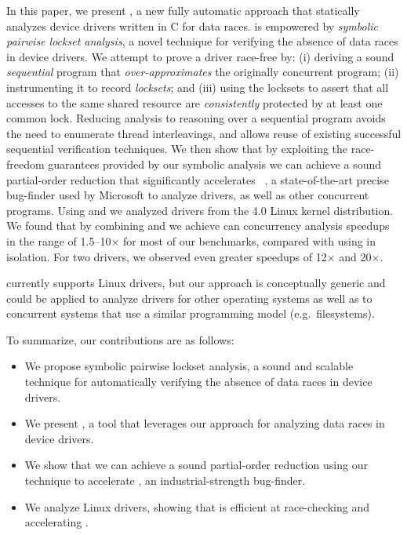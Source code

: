 In this paper, we present \whoop, a new fully automatic approach that statically analyzes device drivers written in C for data races. \whoop is empowered by \emph{symbolic pairwise lockset analysis}, a novel technique for verifying the absence of data races in device drivers. We attempt to prove a driver race-free by: (i) deriving a sound \emph{sequential} program that \emph{over-approximates} the originally concurrent program; (ii) instrumenting it to record \emph{locksets}; and (iii) using the locksets to assert that all accesses to the same shared resource are \emph{consistently} protected by at least one common lock. Reducing analysis to reasoning over a sequential program avoids the need to enumerate thread interleavings, and allows reuse of existing successful sequential verification techniques.
%
We then show that by exploiting the race-freedom guarantees provided by our symbolic analysis we can achieve a sound partial-order reduction that significantly accelerates \corral~\cite{lal2012corral}, a state-of-the-art precise bug-finder used by Microsoft to analyze drivers, as well as other concurrent programs. Using \whoop and \corral we analyzed \sizeOfBenchmarks drivers from the 4.0 Linux kernel distribution.  We found that by combining \whoop and \corral we achieve can concurrency analysis speedups in the range of 1.5--10$\times$ for most of our benchmarks, compared with using \corral in isolation.  For two drivers, we observed even greater speedups of 12$\times$ and 20$\times$.

\whoop currently supports Linux drivers, but our approach is conceptually generic and could be applied to analyze drivers for other operating systems as well as to concurrent systems that use a similar programming model (e.g.\ filesystems).

To summarize, our contributions are as follows:
\begin{itemize}
\item We propose symbolic pairwise lockset analysis, a sound and scalable technique for automatically verifying the absence of data races in device drivers.
\item We present \whoop, a tool that leverages our approach for analyzing data races in device drivers.
\item We show that we can achieve a sound partial-order reduction using our technique to accelerate \corral, an industrial-strength bug-finder.
\item We analyze \sizeOfBenchmarks Linux drivers, showing that \whoop is efficient at race-checking and accelerating \corral.
\end{itemize}
